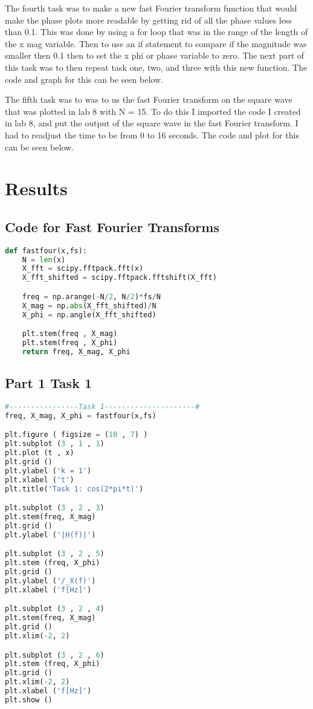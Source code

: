 \documentclass[11pt,a4]{report}
\begin{document}
The fourth task was to make a new fast Fourier transform function that would make the phase plots more readable by getting rid of all the phase values less than 0.1. This was done by using a for loop that was in the range of the length of the x mag variable. Then to use an if statement to compare if the magnitude was smaller then 0.1 then to set the x phi or phase variable to zero. The next part of this task was to then repeat task one, two, and three with this new function. The code and graph for this can be seen below. 

The fifth task was to was to us the fast Fourier transform on the square wave that was plotted in lab 8 with N = 15. To do this I imported the code I created in lab 8, and put the output of the square wave in the fast Fourier transform. I had to readjust the time to be from 0 to 16 seconds. The code and plot for this can be seen below.

\section{Results}
\subsection{Code for Fast Fourier Transforms}

\begin{lstlisting}[language=Python]
def fastfour(x,fs):
    N = len(x) 
    X_fft = scipy.fftpack.fft(x) 
    X_fft_shifted = scipy.fftpack.fftshift(X_fft) 

    freq = np.arange(-N/2, N/2)*fs/N 
    X_mag = np.abs(X_fft_shifted)/N 
    X_phi = np.angle(X_fft_shifted) 

    plt.stem(freq , X_mag) 
    plt.stem(freq , X_phi) 
    return freq, X_mag, X_phi
\end{lstlisting}


\subsection{Part 1 Task 1}

\begin{lstlisting}[language=Python]
#----------------Task 1---------------------#
freq, X_mag, X_phi = fastfour(x,fs)

plt.figure ( figsize = (10 , 7) )
plt.subplot (3 , 1 , 1)
plt.plot (t , x)
plt.grid ()
plt.ylabel ('k = 1')
plt.xlabel ('t')
plt.title('Task 1: cos(2*pi*t)')

plt.subplot (3 , 2 , 3)
plt.stem(freq, X_mag)
plt.grid ()
plt.ylabel ('|H(f)|')

plt.subplot (3 , 2 , 5)
plt.stem (freq, X_phi)
plt.grid ()
plt.ylabel ('/_X(f)')
plt.xlabel ('f[Hz]')

plt.subplot (3 , 2 , 4)
plt.stem(freq, X_mag)
plt.grid ()
plt.xlim(-2, 2)

plt.subplot (3 , 2 , 6)
plt.stem (freq, X_phi)
plt.grid ()
plt.xlim(-2, 2)
plt.xlabel ('f[Hz]')
plt.show ()
\end{lstlisting}
\end{document}
